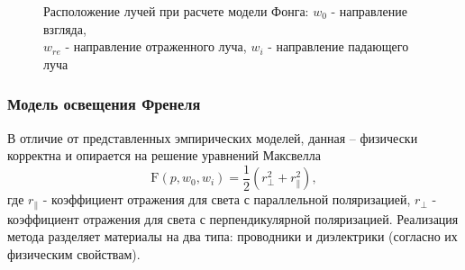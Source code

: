 \begin{figure}[h]
    \centering
    \def\svgwidth{0.6\textwidth}
    
    \caption{Расположение лучей при расчете модели Фонга: $w_0$ - направление
             взгляда,\\ $w_{re}$ - направление отраженного луча, $w_i$ -
             направление падающего луча}
    \label{fig:specular}
\end{figure}

\subsubsection{Модель освещения Френеля}
В отличие от представленных эмпирических моделей, данная -- физически
корректна и опирается на решение уравнений Максвелла~\cite{PBRT}
\begin{equation} \label{math:ffresnel}
    \mathrm{F}(p, w_0, w_i) = \frac12(r_\perp^2 + r_\parallel^2),
\end{equation}
где $r_\parallel$ - коэффициент отражения для света с параллельной поляризацией,
$r_\perp$ - коэффициент отражения для света с перпендикулярной поляризацией.
Реализация метода разделяет материалы на два типа: проводники и
диэлектрики (согласно их физическим свойствам).

